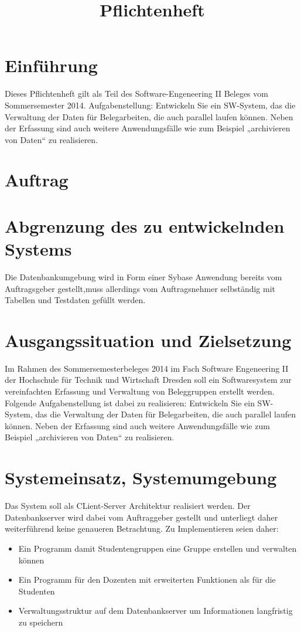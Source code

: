 \documentclass{article}
\title{Pflichtenheft}
\begin{document}
\maketitle
\newpage
\tableofcontents
\newpage

\part{Einführung}

Dieses Pflichtenheft gilt als Teil des Software-Engeneering II Beleges vom Sommersemester 2014.
Aufgabenstellung:
Entwickeln  Sie ein SW-System, das die Verwaltung der Daten für Belegarbeiten, die auch parallel laufen können. Neben der Erfassung sind auch weitere Anwendungsfälle wie zum Beispiel „archivieren von Daten“ zu realisieren.

\newpage
\part{Auftrag}


\newpage
\part{Abgrenzung des zu entwickelnden Systems}
Die Datenbankumgebung wird in Form einer Sybase Anwendung bereits vom Auftragsgeber gestellt,muss allerdings vom Auftragsnehmer selbständig mit Tabellen und Testdaten gefüllt werden.
 

\newpage
\part{Ausgangssituation und Zielsetzung}
Im Rahmen des Sommersemesterbeleges 2014 im Fach Software Engeneering II der Hochschule für Technik und Wirtschaft Dresden soll ein Softwaresystem zur vereinfachten Erfassung und Verwaltung von Beleggruppen erstellt werden.
Folgende Aufgabenstellung ist dabei zu realisieren:
Entwickeln  Sie ein SW-System, das die Verwaltung der Daten für Belegarbeiten, die auch parallel laufen können. Neben der Erfassung sind auch weitere Anwendungsfälle wie zum Beispiel „archivieren von Daten“ zu realisieren.


\newpage
\part{Systemeinsatz, Systemumgebung}
Das System soll als CLient-Server Architektur realisiert werden. Der Datenbankserver wird dabei vom Auftraggeber gestellt und unterliegt daher weiterführend keine genaueren Betrachtung. Zu Implementieren seien daher:
\begin{itemize}
\item Ein Programm damit Studentengruppen eine Gruppe erstellen und verwalten können
\item Ein Programm für den Dozenten mit erweiterten Funktionen als für die Studenten
\item Verwaltungsstruktur auf dem Datenbankserver um Informationen langfristig zu speichern
\end{itemize}
\end{document}
